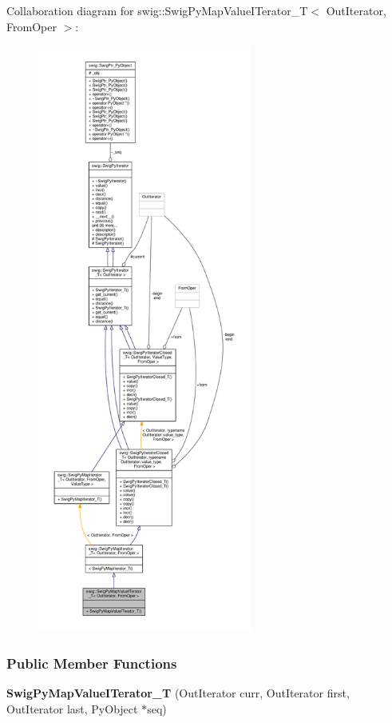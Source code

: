 Collaboration diagram for swig\+:\+:Swig\+Py\+Map\+Value\+I\+Terator\+\_\+T$<$ Out\+Iterator, From\+Oper $>$\+:
\nopagebreak
\begin{figure}[H]
\begin{center}
\leavevmode
\includegraphics[height=550pt]{d9/d7e/structswig_1_1SwigPyMapValueITerator__T__coll__graph}
\end{center}
\end{figure}
\subsubsection*{Public Member Functions}
\begin{DoxyCompactItemize}
\item 
{\bf Swig\+Py\+Map\+Value\+I\+Terator\+\_\+T} (Out\+Iterator curr, Out\+Iterator first, Out\+Iterator last, Py\+Object $\ast$seq)
\end{DoxyCompactItemize}
